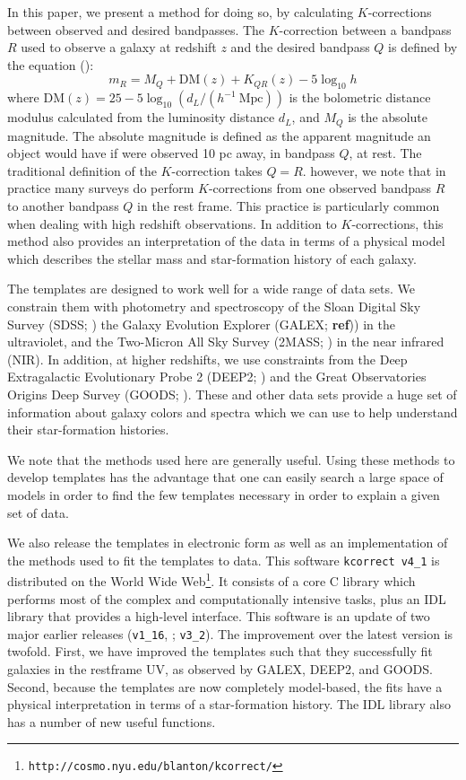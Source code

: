 \documentclass[10pt,preprint]{aastex}
\begin{document}
In this paper, we present a method for doing so, by calculating
$K$-corrections between observed and desired bandpasses.  The
$K$-correction between a bandpass $R$ used to observe a galaxy at
redshift $z$ and the desired bandpass $Q$ is defined by the equation
(\citealt{oke68a, hogg02a}):
\begin{equation}
m_R = M_Q + \mathrm{DM}(z) + K_{QR}(z) - 5 \log_{10} h 
\end{equation}
where $\mathrm{DM}(z) = 25 - 5\log_{10} (d_L / (h^{-1}{\mathrm{~Mpc}}))$ is the
bolometric distance modulus calculated from the luminosity distance
$d_L$, and $M_Q$ is the absolute magnitude. The absolute magnitude is
defined as the apparent magnitude an object would have if were
observed 10 pc away, in bandpass $Q$, at rest.  The traditional
definition of the $K$-correction takes $Q=R$. however, we note that in
practice many surveys do perform $K$-corrections from one observed
bandpass $R$ to another bandpass $Q$ in the rest frame. This practice
is particularly common when dealing with high redshift observations.
In addition to $K$-corrections, this method also provides an
interpretation of the data in terms of a physical model which
describes the stellar mass and star-formation history of each galaxy.

The templates are designed to work well for a wide range of data sets.
We constrain them with photometry and spectroscopy of the Sloan
Digital Sky Survey (SDSS; \citealt{york00a}) the Galaxy Evolution
Explorer (GALEX; {\bf ref})) in the ultraviolet, and the Two-Micron
All Sky Survey (2MASS; \citealt{skrutskie97a}) in the near infrared
(NIR). In addition, at higher redshifts, we use constraints from the
Deep Extragalactic Evolutionary Probe 2 (DEEP2; \citealt{davis03a,
faber03a}) and the Great Observatories Origins Deep Survey (GOODS;
\citealt{giavalisco04a}).  These and other data sets provide a huge set of
information about galaxy colors and spectra which we can use to help
understand their star-formation histories.

We note that the methods used here are generally useful. Using these
methods to develop templates has the advantage that one can easily
search a large space of models in order to find the few templates
necessary in order to explain a given set of data.

We also release the templates in electronic form as well as an
implementation of the methods used to fit the templates to data. This
software {\tt kcorrect v4\_1} is distributed on the World Wide
Web{\footnote {\tt http://cosmo.nyu.edu/blanton/kcorrect/}}. It
consists of a core C library which performs most of the complex and
computationally intensive tasks, plus an IDL library that provides a
high-level interface.  This software is an update of two major earlier
releases ({\tt v1\_16}, \citealt{blanton03b}; {\tt v3\_2}). The
improvement over the latest version is twofold. First, we have
improved the templates such that they successfully fit galaxies in the
restframe UV, as observed by GALEX, DEEP2, and GOODS. Second, because
the templates are now completely model-based, the fits have a physical
interpretation in terms of a star-formation history. The IDL library
also has a number of new useful functions.
\end{document}
